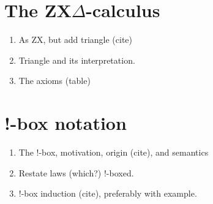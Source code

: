 \section{The ZX$\Delta$-calculus}\label{sec:zxd-background}

\begin{TODOLIST}
\begin{enumerate}
\item As ZX, but add triangle (cite)
\item Triangle and its interpretation.
\item The axioms (table)
\end{enumerate}
\end{TODOLIST}


\section{!-box notation}\label{sec:bangbox}

\begin{TODOLIST}
\begin{enumerate}
\item The !-box, motivation, origin (cite), and semantics
\item Restate laws (which?) !-boxed.
\item !-box induction (cite), preferably with example.
\end{enumerate}
\end{TODOLIST}
